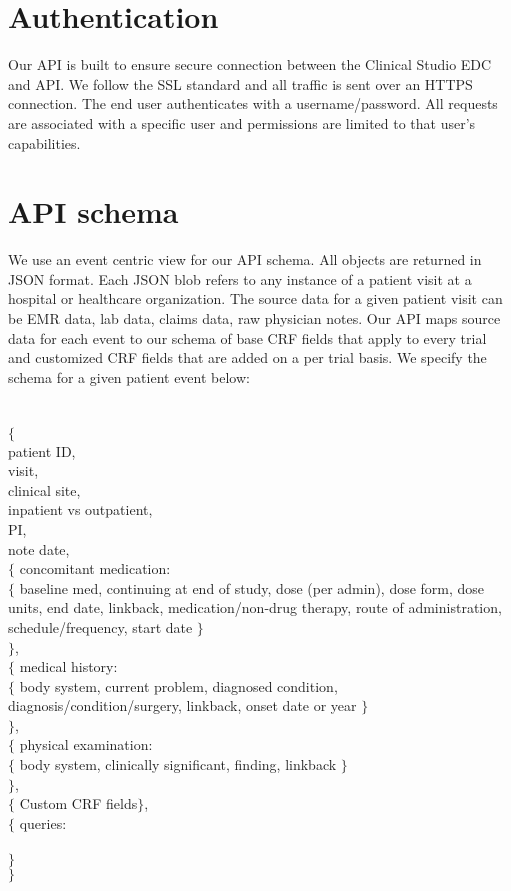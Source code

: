 \documentclass[12pt]{article}
\begin{document}
\section{Authentication}
Our API is built to ensure secure connection between the Clinical Studio EDC and API. We follow the SSL standard and all traffic is sent over an HTTPS connection. The end user authenticates with a username/password. All requests are associated with a specific user and permissions are limited to that user's capabilities.


\section{API schema}
We use an event centric view for our API schema. All objects are returned in JSON format. Each JSON blob refers to any instance of a patient visit at a hospital or healthcare organization. The source data for a given patient visit can be EMR data, lab data, claims data, raw physician notes. Our API maps source data for each event to our schema of base CRF fields that apply to every trial and customized CRF fields that are added on a per trial basis. We specify the schema for a given patient event below:
\\
\\
\\
$\{$ 
\\
patient ID,
\\
visit,
\\
clinical site,
\\
inpatient vs outpatient,
\\
PI,
\\
note date,
\\
$\{$ concomitant medication:
\\
\indent $\{$ baseline med, continuing at end of study, dose (per admin), dose form, dose units, end date, linkback, medication/non-drug therapy, route of administration, schedule/frequency, start date $\}$
\\
\indent $\}$,
\\
$\{$ medical history:
\\
\indent $\{$ body system, current problem, diagnosed condition, diagnosis/condition/surgery, linkback, onset date or year $\}$
\\
\indent $\}$,
\\
$\{$ physical examination:
\\
\indent $\{$ body system, clinically significant, finding, linkback $\}$
\\
\indent $\}$,
\\
$\{$ Custom CRF fields$\}$,
\\
$\{$ queries:
\\
\\
\indent $\}$
\\
$\}$
\end{document}
